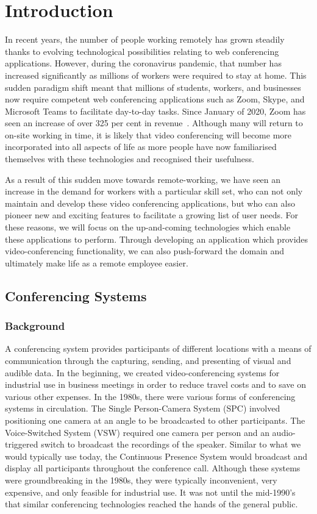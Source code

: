 \chapter{Introduction}
In recent years, the number of people working remotely has grown steadily thanks to evolving technological possibilities relating to web conferencing applications. However, during the coronavirus pandemic, that number has increased significantly as millions of workers were required to stay at home. This sudden paradigm shift meant that millions of students, workers, and businesses now require competent web conferencing applications such as Zoom, Skype, and Microsoft Teams to facilitate day-to-day tasks. Since January of 2020, Zoom has seen an increase of over 325 per cent in revenue~\cite{RichterZoom}. Although many will return to on-site working in time, it is likely that video conferencing will become more incorporated into all aspects of life as more people have now familiarised themselves with these technologies and recognised their usefulness.~\cite{samet2020coronavirus}  

As a result of this sudden move towards remote-working, we have seen an increase in the demand for workers with a particular skill set, who can not only maintain and develop these video conferencing applications, but who can also pioneer new and exciting features to facilitate a growing list of user needs. For these reasons, we will focus on the up-and-coming technologies which enable these applications to perform. Through developing an application which provides video-conferencing functionality, we can also push-forward the domain and ultimately make life as a remote employee easier.  

\section{Conferencing Systems}
\subsection{Background}
A conferencing system provides participants of different locations with a means of communication through the capturing, sending, and presenting of visual and audible data. In the beginning, we created video-conferencing systems for industrial use in business meetings in order to reduce travel costs and to save on various other expenses. In the 1980s, there were various forms of conferencing systems in circulation. The Single Person-Camera System (SPC) involved positioning one camera at an angle to be broadcasted to other participants. The Voice-Switched System (VSW) required one camera per person and an audio-triggered switch to broadcast the recordings of the speaker. Similar to what we would typically use today, the Continuous Presence System would broadcast and display all participants throughout the conference call. \cite{sabri1985video} Although these systems were groundbreaking in the 1980s, they were typically inconvenient, very expensive, and only feasible for industrial use. It was not until the mid-1990's that similar conferencing technologies reached the hands of the general public. 


